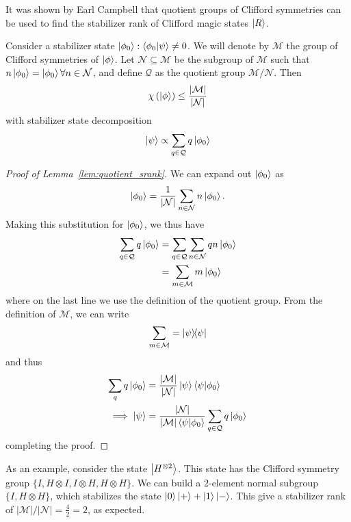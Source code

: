 It was shown by Earl Campbell that quotient groups of Clifford symmetries can be used to find the stabilizer rank of Clifford magic states $\ket{R}$. 
\begin{lem}\label{lem:quotient_srank}
Consider a stabilizer state $\ket{\phi_{0}}:\braket{\phi_{0}}{\psi}\neq 0$. We will denote by $\mathcal{M}$ the group of Clifford symmetries of $\ket{\phi}$. Let $\mathcal{N}\subseteq\mathcal{M}$ be the subgroup of $\mathcal{M}$ such that $n\ket{\phi_{0}}=\ket{\phi_{0}}\forall n\in\mathcal{N}$, and define $\mathcal{Q}$ as the quotient group $\mathcal{M}/\mathcal{N}$. Then
\begin{equation}
\chi\left(\ket{\phi}\right)\leq \frac{\left|\mathcal{M}\right|}{\left|\mathcal{N}\right|}
\label{eq:quotient_srank}
\end{equation}
with stabilizer state decomposition
\begin{equation}
\ket{\psi} \propto \sum_{q\in\mathcal{Q}}q\ket{\phi_{0}}
\label{eq:subgroup_decomposition}
\end{equation}
\end{lem}
\begin{proof}[Proof of Lemma~\ref{lem:quotient_srank}]
We can expand out $\ket{\phi_{0}}$ as
\[\ket{\phi_{0}}=\frac{1}{\left|\mathcal{N}\right|}\sum_{n\in\mathcal{N}}n\ket{\phi_{0}}.\]
Making this substitution for $\ket{\phi_{0}}$, we thus have
\begin{align*}
\sum_{q\in\mathcal{Q}}q\ket{\phi_{0}}&=\sum_{q\in\mathcal{Q}}\sum_{n\in\mathcal{N}}qn\ket{\phi_{0}}\\&=\sum_{m\in\mathcal{M}}m\ket{\phi_{0}}
\end{align*}
where on the last line we use the definition of the quotient group. From the definition of $\mathcal{M}$, we can write
\[\sum_{m\in\mathcal{M}}=\ketbra{\psi}\]
and thus
\begin{align*}
\sum_{q}q\ket{\phi_{0}}&=\frac{\left|\mathcal{M}\right|}{\left|\mathcal{N}\right|} \ket{\psi}\braket{\psi}{\phi_{0}}\\
\implies \ket{\psi} &= \frac{\left|\mathcal{N}\right|}{\left|\mathcal{M}\right|\braket{\psi}{\phi_{0}}} \sum_{q\in\mathcal{Q}}q\ket{\phi_{0}}
\end{align*}
completing the proof.
\end{proof}
As an example, consider the state $\ket{H^{\otimes 2}}$. This state has the Clifford symmetry group $\{I, H\otimes I, I\otimes H, H\otimes H\}$. We can build a $2$-element normal subgroup $\{I,H\otimes H\}$, which stabilizes the state $
\ket{0}\ket{+} + \ket{1}\ket{-}$. This give a stabilizer rank of $\left|\mathcal{M}\right|/\left|\mathcal{N}\right|=\frac{4}{2}=2$, as expected.\par
